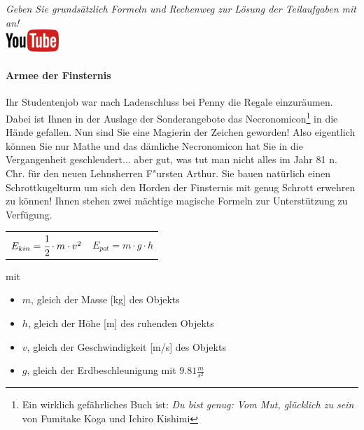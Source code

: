 \documentclass[a4paper, 9pt]{scrartcl}\usepackage[]{graphicx}\usepackage[]{xcolor}
\begin{document}
\textit{Geben Sie grunds{\"a}tzlich Formeln und Rechenweg zur L{\"o}sung der
  Teilaufgaben mit an!} \\[1Ex]

\hfill\href{https://youtu.be/Bbu6n8MXxQk}{\includegraphics[width =
  2cm]{img/youtube}} %
\hspace{2Ex}

\paragraph{Armee der Finsternis}



Ihr Studentenjob war nach Ladenschluss bei Penny die Regale
einzur{\"a}umen. Dabei ist Ihnen in der Auslage der Sonderangebote das
Necronomicon\footnote{Ein wirklich gef{\"a}hrliches Buch ist:
  \textit{Du bist genug: Vom Mut, gl{\"u}cklich zu sein} von Fumitake Koga und
  Ichiro Kishimi} in die H{\"a}nde gefallen. Nun sind Sie eine Magierin der
Zeichen geworden! Also eigentlich k{\"o}nnen Sie nur Mathe und das d{\"a}mliche
Necronomicon hat Sie in die Vergangenheit geschleudert... aber gut, was tut
man nicht alles im Jahr 81 n. Chr. f{\"u}r den neuen Lehnsherren
F{"u}rsten Arthur. Sie bauen nat{\"u}rlich einen Schrottkugelturm um sich den
Horden der Finsternis mit genug Schrott erwehren zu k{\"o}nnen! Ihnen stehen
zwei m{\"a}chtige magische Formeln zur Unterst{\"u}tzung zu Verf{\"u}gung.

\begin{center}
  \begin{tabular}{cc}
    $E_{kin} = \cfrac{1}{2}\cdot m \cdot v^2$ & $E_{pot} = m \cdot g \cdot h$\\
  \end{tabular}
\end{center}

mit

\begin{itemize}
\item $m$, gleich der Masse [kg] des Objekts
\item $h$, gleich der H{\"o}he [m] des ruhenden Objekts
\item $v$, gleich der Geschwindigkeit [m/s] des Objekts
\item $g$, gleich der Erdbeschleunigung mit $9.81 \tfrac{m}{s^2}$ 
\end{itemize}
\end{document}
